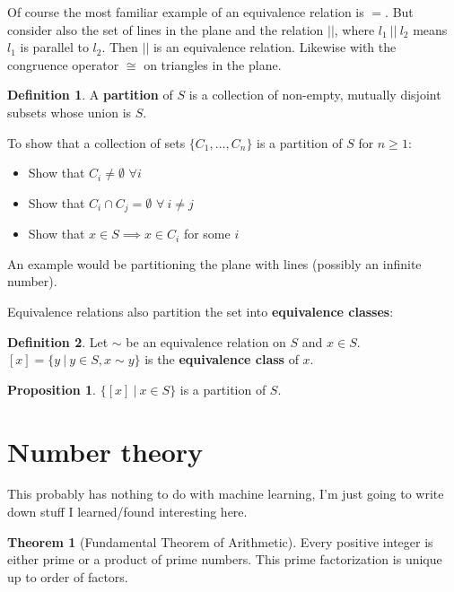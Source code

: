 \documentclass{article}
\theoremstyle{definition}
\newtheorem{definition}{Definition}[section]
\newtheorem{proposition}{Proposition}[section]
\newtheorem{theorem}{Theorem}[section]
\begin{document}
Of course the most familiar example of an equivalence relation is $=$. But consider also the set of lines in the plane and the relation $||$, where $l_1 \ || \ l_2$ means $l_1$ is parallel to $l_2$. Then $||$ is an equivalence relation. Likewise with the congruence operator $\cong$ on triangles in the plane.

\begin{definition}
A \textbf{partition} of $S$ is a collection of non-empty, mutually disjoint subsets whose union is $S$.
\end{definition}

To show that a collection of sets $\{ C_1, \ldots, C_n \}$ is a partition of $S$ for $n \ge 1$:

\begin{itemize}
\item Show that $C_i \neq \emptyset$ $\forall i$
\item Show that $C_i \cap C_j = \emptyset$ $\forall \ i \neq j$
\item Show that $x \in S \implies x \in C_i$ for some $i$
\end{itemize}

An example would be partitioning the plane with lines (possibly an infinite number).

Equivalence relations also partition the set into \textbf{equivalence classes}:

\begin{definition}
Let $\sim$ be an equivalence relation on $S$ and $x \in S$. \\
$[x] = \{ y \ | \ y \in S, x \sim y\}$ is the \textbf{equivalence class} of $x$.
\end{definition}

\begin{proposition}
$\{[x] \ | \ x \in S \}$ is a partition of $S$.
\end{proposition}

\section{Number theory}

This probably has nothing to do with machine learning, I'm just going to write down stuff I learned/found interesting here.

\begin{theorem}[Fundamental Theorem of Arithmetic]
Every positive integer is either prime or a product of prime numbers. This prime factorization is unique up to order of factors.
\end{theorem}
\end{document}
